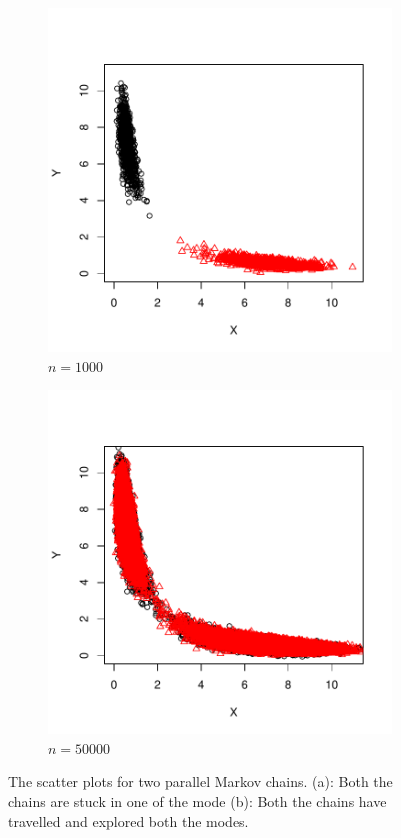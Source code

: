 \documentclass[12pt]{article}
\theoremstyle{remark}
\begin{document}
\begin{figure}[h]
    \centering
    \begin{subfigure}[h]{.4\textwidth}
      \centering
      \includegraphics[width = \textwidth]{plots/scatter_n1000.pdf}
      \caption{$n = 1000$}
      \label{subfig:boom-sp_1e3}
    \end{subfigure}
    \begin{subfigure}[h]{.4\textwidth}
      \centering
      \includegraphics[width = \textwidth]{plots/scatter_n50000.pdf}
      \caption{$n = 50000$}
      \label{boom-sp_1e4}
    \end{subfigure}
    \caption{The scatter plots for two parallel Markov chains. (a): Both the chains are stuck in one of the mode (b): Both the chains have travelled and explored both the modes.}
    \label{fig:boom-sp}
\end{figure}
\end{document}
